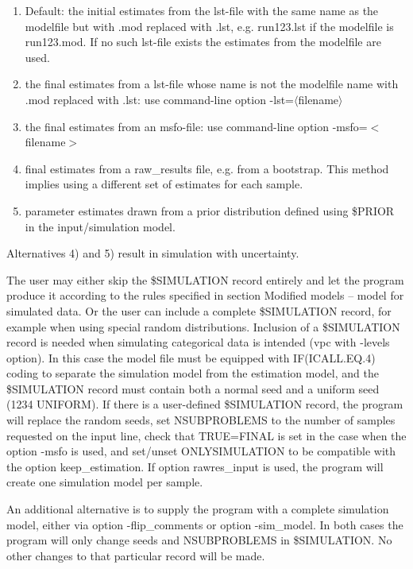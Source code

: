\begin{enumerate}
	\item Default: the initial estimates from the lst-file with the same name as the modelfile but with .mod replaced with .lst, e.g. run123.lst if the modelfile is run123.mod. If no such lst-file exists the estimates from the modelfile are used.
	\item the final estimates from a lst-file whose name is not the modelfile name with .mod replaced with .lst: use command-line option -lst=$\langle$filename$\rangle$
	\item the final estimates from an msfo-file: use command-line option -msfo=$<$filename$>$
	\item final estimates from a raw\_results file, e.g. from a bootstrap. This method implies using a different set of estimates for each sample. 
	\item parameter estimates drawn from a prior distribution defined using \$PRIOR in the input/simulation model.
\end{enumerate}

Alternatives 4) and 5) result in simulation with uncertainty.

The user may either skip the \$SIMULATION record entirely and let the program produce it according to the rules specified in section Modified models – model for simulated data. Or the user can include a complete \$SIMULATION record, for example when using special random distributions. Inclusion of a \$SIMULATION record is needed when simulating categorical data is intended (vpc with -levels option). In this case the model file must be equipped with IF(ICALL.EQ.4) coding to separate the simulation model from the estimation model, and the \$SIMULATION record must contain both a normal seed and a uniform seed (1234 UNIFORM). If there is a user-defined \$SIMULATION record, the program will replace the random seeds, set NSUBPROBLEMS to the number of samples requested on the input line, check that TRUE=FINAL is set in the case when the option -msfo is used, and set/unset ONLYSIMULATION to be compatible with the option keep\_estimation. If option rawres\_input is used, the program will create one simulation model per sample.

An additional alternative is to supply the program with a complete simulation model, either via option -flip\_comments or option -sim\_model. In both cases the program will only change seeds and NSUBPROBLEMS in \$SIMULATION. No other changes to that particular record will be made.

